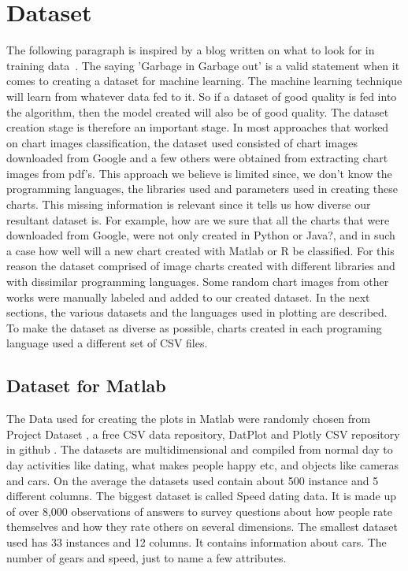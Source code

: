 \documentclass[12pt, a4paper,oneside]{report}
\begin{document}
\section{Dataset}
The following paragraph is inspired by a blog written on what to look for in training data~\cite{edi}.
The saying 'Garbage in Garbage out' is a valid statement when it comes to creating a dataset for machine learning. The machine learning technique will learn from whatever data fed to it. So if a dataset of good quality is fed into the algorithm, then the model created will also be of good quality. The dataset creation stage is therefore an important stage. In most approaches that worked on chart images classification, the dataset used consisted of chart images downloaded from Google and a few others were obtained from extracting chart images from pdf's. This approach we believe is limited since, we don't know the programming languages, the libraries used and parameters used in creating these charts. This missing information is relevant since it tells us how diverse our resultant dataset is. For example, how are we sure that all the charts that were downloaded from Google, were not only created in Python or Java?, and in such a case how well will a new chart created with Matlab or R be classified. For this reason the dataset comprised of image charts created with different libraries and with dissimilar programming languages. Some random chart images from other works were manually labeled and added to our created dataset. In the next sections, the various datasets and the languages used in plotting are described. To make the dataset as diverse as possible, charts created in each programing language used a different set of CSV files. 

\subsection{Dataset for Matlab}
The Data used for creating the plots in Matlab were randomly chosen from Project Dataset \cite{projectdataset}, a free CSV data repository, DatPlot \cite{datplot} and Plotly CSV repository in github \cite{plotly}. The datasets are multidimensional and compiled from normal day to day activities like dating, what makes people happy etc, and objects like cameras and cars. On the average the datasets used contain about 500 instance and 5 different columns. The biggest dataset is called Speed dating data. It is made up of over 8,000 observations of answers to survey questions about how people rate themselves and how they rate others on several dimensions. The smallest dataset used has 33 instances and 12 columns. It contains information about cars. The number of gears and speed, just to name a few attributes.
\end{document}
